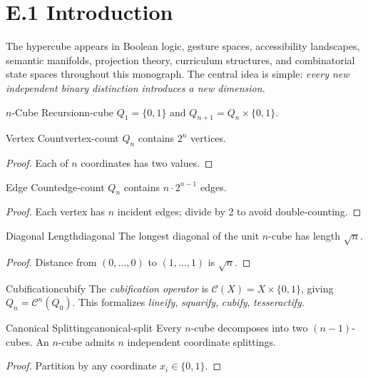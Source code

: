 
\section*{E.1 Introduction}

The hypercube appears in Boolean logic, gesture spaces, accessibility landscapes,
semantic manifolds, projection theory, curriculum structures, and combinatorial
state spaces throughout this monograph. The central idea is simple:
\emph{every new independent binary distinction introduces a new dimension.}

\begin{definition}{$n$-Cube Recursion}{n-cube}
  $Q_1 = \{0,1\}$ and $Q_{n+1} = Q_n \times \{0,1\}$.
\end{definition}

\begin{theorem}{Vertex Count}{vertex-count}
  $Q_n$ contains $2^n$ vertices.
\end{theorem}
\begin{proof}Each of $n$ coordinates has two values.\end{proof}

\begin{theorem}{Edge Count}{edge-count}
  $Q_n$ contains $n \cdot 2^{n-1}$ edges.
\end{theorem}
\begin{proof}Each vertex has $n$ incident edges; divide by 2 to avoid double-counting.\end{proof}

\begin{proposition}{Diagonal Length}{diagonal}
  The longest diagonal of the unit $n$-cube has length $\sqrt{n}$.
\end{proposition}
\begin{proof}Distance from $(0,\ldots,0)$ to $(1,\ldots,1)$ is $\sqrt{n}$.\end{proof}

\begin{definition}{Cubification}{cubify}
  The \emph{cubification operator} is $\mathcal{C}(X) = X \times \{0,1\}$,
  giving $Q_n = \mathcal{C}^n(Q_0)$. This formalizes \emph{lineify},
  \emph{squarify}, \emph{cubify}, \emph{tesseractify}.
\end{definition}

\begin{theorem}{Canonical Splitting}{canonical-split}
  Every $n$-cube decomposes into two $(n{-}1)$-cubes. An $n$-cube admits
  $n$ independent coordinate splittings.
\end{theorem}
\begin{proof}Partition by any coordinate $x_i \in \{0,1\}$.\end{proof}


